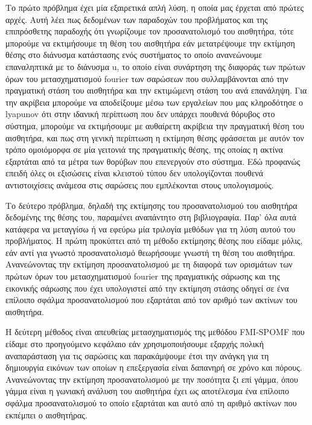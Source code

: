 \documentclass[a4paper,10pt]{article}
\begin{document}
Το πρώτο πρόβλημα έχει μία εξαιρετικά απλή λύση, η οποία μας έρχεται από πρώτες
αρχές. Αυτή λέει πως δεδομένων των παραδοχών του προβλήματος και της
επιπρόσθετης παραδοχής ότι γνωρίζουμε τον προσανατολισμό του αισθητήρα, τότε
μπορούμε να εκτιμήσουμε τη θέση του αισθητήρα εάν μετατρέψουμε την εκτίμηση
θέσης στο διάνυσμα κατάστασης ενός συστήματος το οποίο ανανεώνουμε επαναληπτικά
με το διάνυσμα u, το οποίο είναι συνάρτηση της διαφοράς των πρώτων όρων του
μετασχηματισμού fourier των σαρώσεων που συλλαμβάνονται από την πραγματική
στάση του αισθητήρα και την εκτιμώμενη στάση του ανά επανάληψη. Για την
ακρίβεια μπορούμε να αποδείξουμε μέσω των εργαλείων που μας κληροδότησε ο
lyapunov ότι στην ιδανική περίπτωση που δεν υπάρχει πουθενά θόρυβος στο
σύστημα, μπορούμε να εκτιμήσουμε με αυθαίρετη ακρίβεια την πραγματική θέση του
αισθητήρα, και πως στη γενική περίπτωση η εκτίμηση θέσης φράσσεται με αυτόν τον
τρόπο ομοιόμορφα σε μία γειτονιά της πραγματικής θέσης, της οποίας η ακτίνα
εξαρτάται από τα μέτρα των θορύβων που επενεργούν στο σύστημα. Εδώ προφανώς
επειδή όλες οι εξισώσεις είναι κλειστού τύπου δεν υπολογίζονται πουθενά
αντιστοιχίσεις ανάμεσα στις σαρώσεις που εμπλέκονται στους υπολογισμούς.

Το δεύτερο πρόβλημα, δηλαδή της εκτίμησης του προσανατολισμού του αισθητήρα
δεδομένης της θέσης του, παραμένει αναπάντητο στη βιβλιογραφία. Παρ' όλα αυτά
κατάφερα να μεταγγίσω ή να εφεύρω μία τριλογία μεθόδων για τη λύση αυτού του
προβλήματος. Η πρώτη προκύπτει από τη μέθοδο εκτίμησης θέσης που είδαμε μόλις,
εάν αντί για γνωστό προσανατολισμό θεωρήσουμε γνωστή τη θέση του αισθητήρα.
Ανανεώνοντας την εκτίμηση προσανατολισμού με τη διαφορά των ορισμάτων των
πρώτων όρων του μετασχηματισμού fourier της πραγματικής σάρωσης και της
εικονικής σάρωσης που έχει υπολογιστεί από την εκτίμηση στάσης οδηγεί σε ένα
επίλοιπο σφάλμα προσανατολισμού που εξαρτάται από τον αριθμό των ακτίνων του
αισθητήρα.

Η δεύτερη μέθοδος είναι απευθείας μετασχηματισμός της μεθόδου FMI-SPOMF που
είδαμε στο προηγούμενο κεφάλαιο εάν χρησιμοποιήσουμε εξαρχής πολική
αναπαράσταση για τις σαρώσεις και παρακάμψουμε έτσι την ανάγκη για τη
δημιουργία εικόνων των οποίων η επεξεργασία είναι δαπανηρή σε χρόνο και πόρους.
Ανανεώνοντας την εκτίμηση προσανατολισμού με την ποσότητα ξι επί γάμμα, όπου
γάμμα είναι η γωνιακή ανάλυση του αισθητήρα έχει ως αποτέλεσμα ένα επίλοιπο
σφάλμα προσανατολισμού το οποίο εξαρτάται και αυτό από τη αριθμό ακτίνων που
εκπέμπει ο αισθητήρας.
\end{document}
